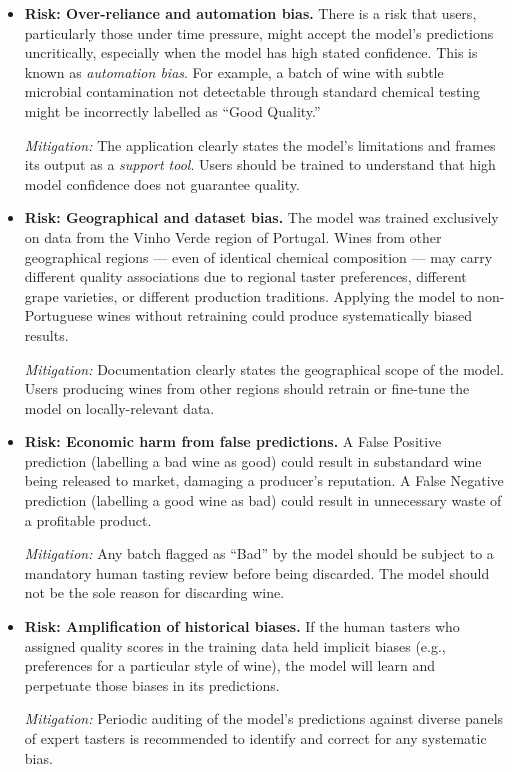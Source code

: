 \documentclass[11pt,a4paper]{article}
\begin{document}
\begin{itemize}[leftmargin=*]
    \item \textbf{Risk: Over-reliance and automation bias.} There is a risk that users, particularly those under time pressure, might accept the model's predictions uncritically, especially when the model has high stated confidence. This is known as \textit{automation bias}. For example, a batch of wine with subtle microbial contamination not detectable through standard chemical testing might be incorrectly labelled as ``Good Quality.''

    \textit{Mitigation:} The application clearly states the model's limitations and frames its output as a \textit{support tool}. Users should be trained to understand that high model confidence does not guarantee quality.

    \item \textbf{Risk: Geographical and dataset bias.} The model was trained exclusively on data from the Vinho Verde region of Portugal. Wines from other geographical regions --- even of identical chemical composition --- may carry different quality associations due to regional taster preferences, different grape varieties, or different production traditions. Applying the model to non-Portuguese wines without retraining could produce systematically biased results.

    \textit{Mitigation:} Documentation clearly states the geographical scope of the model. Users producing wines from other regions should retrain or fine-tune the model on locally-relevant data.

    \item \textbf{Risk: Economic harm from false predictions.} A False Positive prediction (labelling a bad wine as good) could result in substandard wine being released to market, damaging a producer's reputation. A False Negative prediction (labelling a good wine as bad) could result in unnecessary waste of a profitable product.

    \textit{Mitigation:} Any batch flagged as ``Bad'' by the model should be subject to a mandatory human tasting review before being discarded. The model should not be the sole reason for discarding wine.

    \item \textbf{Risk: Amplification of historical biases.} If the human tasters who assigned quality scores in the training data held implicit biases (e.g., preferences for a particular style of wine), the model will learn and perpetuate those biases in its predictions.

    \textit{Mitigation:} Periodic auditing of the model's predictions against diverse panels of expert tasters is recommended to identify and correct for any systematic bias.
\end{itemize}
\end{document}

